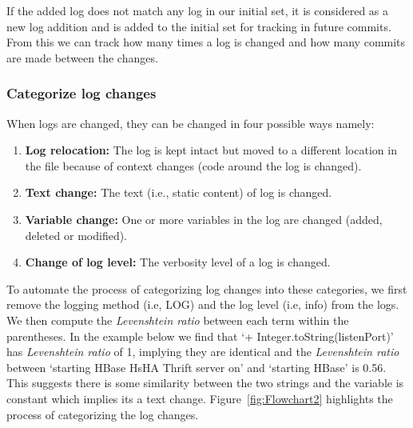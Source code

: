 If the added log does not match any log in our initial set, it is considered as a new log addition and is added to the initial set for tracking in future commits. From this we can track how many times a log is changed and how many commits are made between the changes. 





\subsubsection{Categorize log changes}

When logs are changed, they can be changed in four possible ways namely:
\begin{enumerate}
	
	\item { \textbf{Log relocation:} } The log is kept intact but moved to a different location in the file because of context changes (code around the log is changed).
	
	\item \textbf{Text change:} The text (i.e., static content) of log is changed. 
	
	\item\textbf{Variable change:} One or more variables in the log are changed (added, deleted or modified).
	
	\item \textbf{Change of log level:} The verbosity level of a log is changed.
	
	
\end{enumerate}


To automate the process of categorizing log changes into these categories, we first remove the logging method (i.e, LOG) and the log level (i.e, info) from the logs. We then compute the \textsl{Levenshtein ratio} between each term within the parentheses. In the example below we find that `+ Integer.toString(listenPort)' has \textsl{Levenshtein ratio} of 1, implying they are identical and the \textsl{Levenshtein ratio} between `starting HBase HsHA Thrift server on' and `starting HBase' is 0.56. This suggests there is some similarity between the two strings and the variable is constant which implies its a text change. Figure~\ref{fig:Flowchart2} highlights the process of categorizing the log changes.

